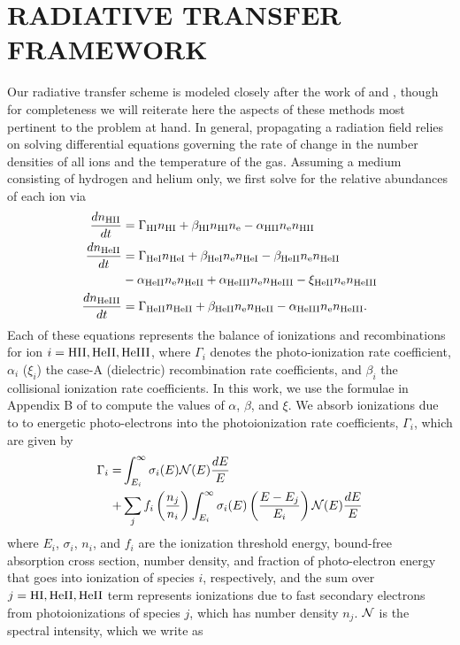 \documentclass[preprint2]{aastex}              %
\begin{document}
\section{RADIATIVE TRANSFER FRAMEWORK}
Our radiative transfer scheme is modeled closely after the work of \cite{Fukugita1994} and \cite{Thomas2008}, though for completeness we will reiterate here the aspects of these methods most pertinent to the problem at hand.  In general, propagating a radiation field relies on solving differential equations governing the rate of change in the number densities of all ions and the temperature of the gas.  Assuming a medium consisting of hydrogen and helium only, we first solve for the relative abundances of each ion via
\begin{align}
    \frac{d n_{\text{HII}}}{dt} & = \Gamma_{\text{HI}} n_{\text{HI}} + \beta_{\text{HI}} n_{\text{HI}} n_{\text{e}} - \alpha_{\text{HII}} n_{\text{e}} n_{\text{HII}}   \label{eq:HIIRateEquation} \\
    \frac{d n_{\text{HeII}}}{dt} & = \Gamma_{\text{HeI}} n_{\text{HeI}} + \beta_{\text{HeI}} n_{\text{e}} n_{\text{HeI}} - \beta_{\text{HeII}} n_{\text{e}} n_{\text{HeII}} \nonumber \\ 
    & - \alpha_{\text{HeII}} n_{\text{e}} n_{\text{HeII}} + \alpha_{\text{HeIII}} n_{\text{e}} n_{\text{HeIII}} - \xi_{\text{HeII}} n_{\text{e}} n_{\text{HeIII}}  \label{eq:HeIIRateEquation} \\
    \frac{d n_{\text{HeIII}}}{dt} & = \Gamma_{\text{HeII}} n_{\text{HeII}} + \beta_{\text{HeII}} n_{\text{e}} n_{\text{HeII}} - \alpha_{\text{HeIII}} n_{\text{e}} n_{\text{HeIII}} . \label{eq:HeIIIRateEquation}
\end{align}
Each of these equations represents the balance of ionizations and recombinations for ion $i = \text{HII}, \text{HeII}, \text{HeIII}$, where $\Gamma_i$ denotes the photo-ionization rate coefficient, $\alpha_i$ ($\xi_i$) the case-A (dielectric) recombination rate coefficients, and $\beta_i$ the collisional ionization rate coefficients.  In this work, we use the formulae in Appendix B of \citet{Fukugita1994} to compute the values of $\alpha$, $\beta$, and $\xi$.    We absorb ionizations due to to energetic photo-electrons into the  photoionization rate coefficients, $\Gamma_i$, which are given by
\begin{align}
    \Gamma_i = & \int_{E_i}^{\infty} \sigma_i(E) \mathcal{N}(E) \frac{dE}{E} \nonumber \\  + & \sum_j f_i \left(\frac{n_j}{n_i}\right) \int_{E_i}^{\infty} \sigma_i(E)\left(\frac{E - E_j}{E_i}\right) \mathcal{N}(E) \frac{dE}{E} \label{eq:PhotoionizationRate}
\end{align}
where $E_i$, $\sigma_i$, $n_i$, and $f_i$ are the ionization threshold energy, bound-free absorption cross section, number density, and fraction of photo-electron energy that goes into ionization of species $i$, respectively, and the sum over $j = \text{HI}, \text{HeII}, \text{HeII}$ term represents ionizations due to fast secondary electrons from photoionizations of species $j$, which has number density $n_j$.  $\mathcal{N}$ is the spectral intensity, which we write as
\end{document}
